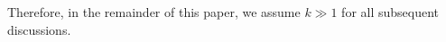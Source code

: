 \documentclass[letter,11pt]{article}
\theoremstyle{definition}
\theoremstyle{definition}
\DeclareMathOperator{\D}{D}
\newcommand{\1}{\boldmath$~1~$\unboldmath}
\newcommand{\Ord}{\mathrm{O}}
\begin{document}

Therefore, in the remainder of this paper, we assume $k \gg 1$ for all subsequent discussions.
\end{document}

